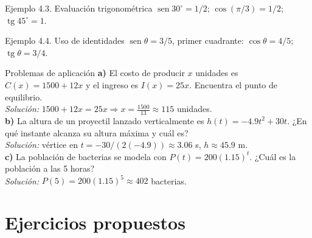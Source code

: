 \documentclass[12pt,letterpaper]{book}
\newcommand{\sen}{\operatorname{sen}}
\newcommand{\tg}{\operatorname{tg}}
\begin{document}
\begin{ejbox}{Ejemplo 4.3. Evaluación trigonométrica}
$\sen30^\circ=1/2$; $\cos(\pi/3)=1/2$; $\tg45^\circ=1$.
\end{ejbox}

\begin{ejbox}{Ejemplo 4.4. Uso de identidades}
$\sen\theta=3/5$, primer cuadrante: $\cos\theta=4/5$; $\tg\theta=3/4$.
\end{ejbox}

\begin{aplbox}{Problemas de aplicación}
\textbf{a)} El costo de producir $x$ unidades es $C(x)=1500+12x$ y el ingreso es $I(x)=25x$. Encuentra el punto de equilibrio.\\
\textit{Solución:} $1500+12x=25x\Rightarrow x=\tfrac{1500}{13}\approx115$ unidades.\\[4pt]
\textbf{b)} La altura de un proyectil lanzado verticalmente es $h(t)=-4.9t^2+30t$. ¿En qué instante alcanza su altura máxima y cuál es?\\
\textit{Solución:} vértice en $t=-30/(2(-4.9))\approx3.06$ s, $h\approx45.9$ m.\\[4pt]
\textbf{c)} La población de bacterias se modela con $P(t)=200(1.15)^t$. ¿Cuál es la población a las 5 horas?\\
\textit{Solución:} $P(5)=200(1.15)^5\approx402$ bacterias.
\end{aplbox}

\section{Ejercicios propuestos}
\end{document}
